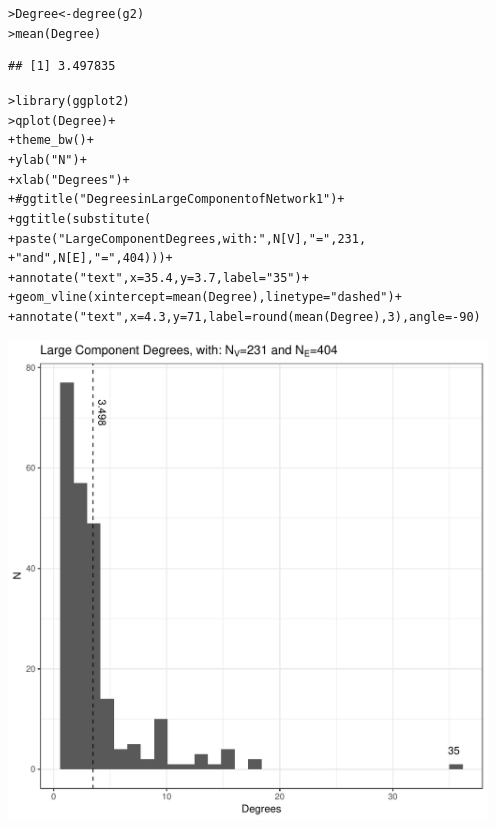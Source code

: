 \documentclass[12pt]{article}\usepackage[]{graphicx}\usepackage[]{color}
\makeatletter
\newcommand{\hlnum}[1]{\textcolor[rgb]{0.82,0.78,0.62}{#1}}%
\newcommand{\hlstr}[1]{\textcolor[rgb]{0.82,0.78,0.62}{#1}}%
\newcommand{\hlcom}[1]{\textcolor[rgb]{0.404,0.408,0.42}{#1}}%
\newcommand{\hlopt}[1]{\textcolor[rgb]{0.882,0.878,0.898}{#1}}%
\newcommand{\hlstd}[1]{\textcolor[rgb]{0.882,0.878,0.898}{#1}}%
\newcommand{\hlkwb}[1]{\textcolor[rgb]{0.902,0.675,0.196}{#1}}%
\newcommand{\hlkwc}[1]{\textcolor[rgb]{0.812,0.522,0.388}{#1}}%
\newcommand{\hlkwd}[1]{\textcolor[rgb]{0.733,0.388,0.812}{#1}}%
\newenvironment{kframe}{%
 \def\at@end@of@kframe{}%
 \ifinner\ifhmode%
  \def\at@end@of@kframe{\end{minipage}}%
  \begin{minipage}{\columnwidth}%
 \fi\fi%
 \def\FrameCommand##1{\hskip\@totalleftmargin \hskip-\fboxsep
 \colorbox{shadecolor}{##1}\hskip-\fboxsep
     \hskip-\linewidth \hskip-\@totalleftmargin \hskip\columnwidth}%
 \MakeFramed {\advance\hsize-\width
   \@totalleftmargin\z@ \linewidth\hsize
   \@setminipage}}%
 {\par\unskip\endMakeFramed%
 \at@end@of@kframe}
\newenvironment{knitrout}{}{} %
\makeatother
\begin{document}
\begin{flushleft}
\begin{center}
\begin{knitrout}
\color{fgcolor}\begin{kframe}
\begin{alltt}
\hlstd{> }\hlstd{Degree} \hlkwb{<-} \hlkwd{degree}\hlstd{(g2)}
\hlstd{> }\hlkwd{mean}\hlstd{(Degree)}
\end{alltt}
\begin{verbatim}
## [1] 3.497835
\end{verbatim}
\begin{alltt}
\hlstd{> }\hlkwd{library}\hlstd{(ggplot2)}
\hlstd{> }\hlkwd{qplot}\hlstd{(Degree)}\hlopt{+}
\hlstd{+ }     \hlkwd{theme_bw}\hlstd{()}\hlopt{+}
\hlstd{+ }     \hlkwd{ylab}\hlstd{(}\hlstr{"N"}\hlstd{)}\hlopt{+}
\hlstd{+ }     \hlkwd{xlab}\hlstd{(}\hlstr{"Degrees"}\hlstd{)}\hlopt{+}
\hlstd{+ }     \hlcom{#ggtitle("Degrees in Large Component of Network 1")+}
\hlstd{+ }     \hlkwd{ggtitle}\hlstd{(}\hlkwd{substitute}\hlstd{(}
\hlstd{+ }          \hlkwd{paste}\hlstd{(} \hlstr{"Large Component Degrees, with: "}\hlstd{, N[V],} \hlstr{"="}\hlstd{,} \hlnum{231}\hlstd{,}
\hlstd{+ }                 \hlstr{" and "}\hlstd{, N[E],} \hlstr{"="}\hlstd{,} \hlnum{404}\hlstd{)))}\hlopt{+}
\hlstd{+ }     \hlkwd{annotate}\hlstd{(}\hlstr{"text"}\hlstd{,} \hlkwc{x} \hlstd{=} \hlnum{35.4}\hlstd{,} \hlkwc{y} \hlstd{=} \hlnum{3.7}\hlstd{,} \hlkwc{label} \hlstd{=} \hlstr{"35"}\hlstd{)}\hlopt{+}
\hlstd{+ }     \hlkwd{geom_vline}\hlstd{(}\hlkwc{xintercept}\hlstd{=}\hlkwd{mean}\hlstd{(Degree),} \hlkwc{linetype}\hlstd{=}\hlstr{"dashed"}\hlstd{)}\hlopt{+}
\hlstd{+ }     \hlkwd{annotate}\hlstd{(}\hlstr{"text"}\hlstd{,} \hlkwc{x} \hlstd{=} \hlnum{4.3}\hlstd{,} \hlkwc{y} \hlstd{=} \hlnum{71}\hlstd{,} \hlkwc{label} \hlstd{=} \hlkwd{round}\hlstd{(}\hlkwd{mean}\hlstd{(Degree),}\hlnum{3}\hlstd{),} \hlkwc{angle}\hlstd{=}\hlopt{-}\hlnum{90}\hlstd{)}
\end{alltt}
\end{kframe}
\includegraphics[width=5in]{figure/plot3-1} 


\end{knitrout}
\end{center}
\end{flushleft}
\end{document}
